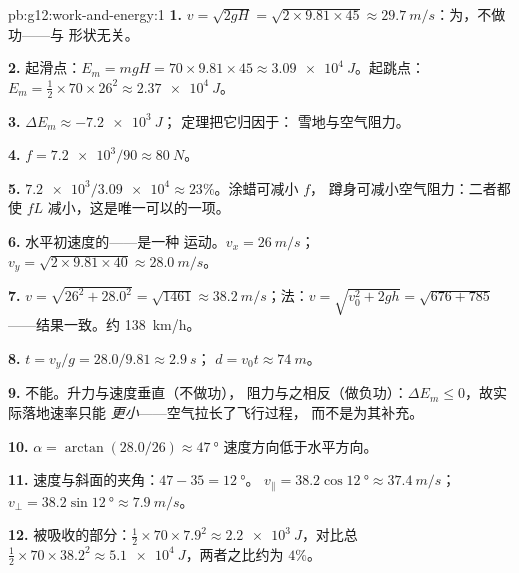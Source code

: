 \begin{solution}{pb:g12:work-and-energy:1}
\textbf{1.} $v = \sqrt{2gH} = \sqrt{2 \times 9.81 \times 45} \approx
\qty{29.7}{m/s}$：为，不做功——与
形状无关。

\textbf{2.} 起滑点：$E_m = mgH = 70 \times 9.81 \times 45 \approx
\qty{3.09e4}{J}$。起跳点：$E_m = \tfrac12 \times 70 \times 26^2
\approx \qty{2.37e4}{J}$。

\textbf{3.} $\Delta E_m \approx \qty{-7.2e3}{J}$；
定理把它归因于：
雪地与空气阻力。

\textbf{4.} $f = \num{7.2e3}/90 \approx \qty{80}{N}$。

\textbf{5.} $\num{7.2e3}/\num{3.09e4} \approx 23\%$。涂蜡可减小 $f$，
蹲身可减小空气阻力：二者都使 $fL$ 减小，这是唯一可以的一项。

\textbf{6.} 水平初速度的——是一种
运动。$v_x = \qty{26}{m/s}$；
$v_y = \sqrt{2 \times 9.81 \times 40} \approx \qty{28.0}{m/s}$。

\textbf{7.} $v = \sqrt{26^2 + 28.0^2} = \sqrt{1461} \approx
\qty{38.2}{m/s}$；法：$v = \sqrt{v_0^2 + 2gh} = \sqrt{676 + 785}$
——结果一致。约 \qty{138}{km/h}。

\textbf{8.} $t = v_y/g = 28.0/9.81 \approx \qty{2.9}{s}$；
$d = v_0 t \approx \qty{74}{m}$。

\textbf{9.} 不能。升力与速度垂直（不做功），
阻力与之相反（做负功）：$\Delta E_m \leq 0$，故实际落地速率只能
\emph{更小}——空气拉长了飞行过程，
而不是为其补充。

\textbf{10.} $\alpha = \arctan(28.0/26) \approx \qty{47}{\degree}$
速度方向低于水平方向。

\textbf{11.} 速度与斜面的夹角：$47 - 35 = \qty{12}{\degree}$。
$v_\parallel = 38.2\cos\qty{12}{\degree} \approx \qty{37.4}{m/s}$；
$v_\perp = 38.2\sin\qty{12}{\degree} \approx \qty{7.9}{m/s}$。

\textbf{12.} 被吸收的部分：$\tfrac12 \times 70 \times 7.9^2 \approx
\qty{2.2e3}{J}$，对比总 $\tfrac12 \times 70 \times 38.2^2 \approx
\qty{5.1e4}{J}$，两者之比约为 $4\%$。


\end{solution}
